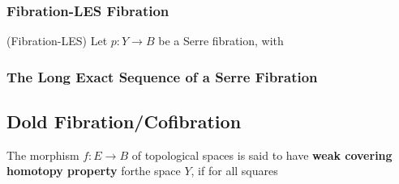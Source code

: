 \documentclass[Total.tex]{subfiles}
\begin{document}
				\subsubsection{Fibration-LES Fibration}
					\begin{theorem} 
						(Fibration-LES) Let $p:Y\rightarrow B$ be a Serre fibration, with  
					\end{theorem}
				\subsubsection{The Long Exact Sequence of a Serre Fibration}
					
			\subsection{Dold Fibration/Cofibration}
				\begin{Def}
					The morphism $f:E\rightarrow B $ of topological spaces is said to have \textbf{weak covering homotopy property} forthe space $Y$, if for all squares
					\begin{center}
					\end{center}
				\end{Def}
\end{document}
